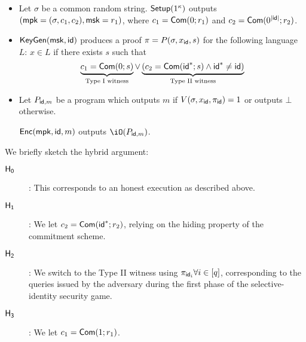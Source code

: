 \begin{itemize}
\item
	Let $\sigma$ be a common random string.
	$\mathsf{Setup}(1^\kappa)$ outputs $(\mathsf{mpk} = (\sigma, c_1, c_2), \mathsf{msk} =
	r_1)$, where $c_1 = \mathsf{Com}(0 ; r_1)$ and
	$c_2 = \mathsf{Com}(0^{|\mathsf{id}|} ; r_2)$.

\item
	$\mathsf{KeyGen}(\mathsf{msk}, \mathsf{id})$ produces a proof
	$\pi = P(\sigma, x_{\mathsf{id}}, s)$ for the following language $L$:
	$x \in L$ if there exists $s$ such that
\begin{equation*}
\underbrace{c_1 = \mathsf{Com}(0 ; s)}_{\text{Type I witness}} \lor
\underbrace{\left( c_2 = \mathsf{Com}(\mathsf{id}^* ; s) \land \mathsf{id}^* \ne \mathsf{id}
	\right)}_{\text{Type II witness}}
\end{equation*}

\item
	Let $P_{\mathsf{id},m}$ be a program which outputs $m$ if
	$V(\sigma, x_{\mathsf{id}}, \pi_{\mathsf{id}}) = 1$ or outputs $\bot$ otherwise.

	$\mathsf{Enc}(\mathsf{mpk}, \mathsf{id}, m)$ outputs $\iO(P_{\id,m})$.
\end{itemize}

We briefly sketch the hybrid argument:
\begin{description}
\item[$\mathsf{H_{0}}$]:
	This corresponds to an honest execution as described above.
\item[$\mathsf{H_{1}}$]:
	We let $c_2 = \mathsf{Com}(\mathsf{id}^* ; r_2)$, relying on the hiding property
	of the commitment scheme.
\item[$\mathsf{H_{2}}$]:
	We switch to the Type II witness using
	$\pi_{\mathsf{id}_i} \forall i \in [q]$, corresponding to the queries
	issued by the adversary during the first phase of the
	selective-identity security game.
\item[$\mathsf{H_{3}}$]:
	We let $c_1 = \mathsf{Com}(1 ; r_1)$.
\end{description}





\newcommand{\extline}{$\scriptsize$-$\normalsize$\!}
\newcommand{\lextlineend}{$\scriptsize$\lhd\!$\normalsize$}
\newcommand{\rextlineend}{$\scriptsize\rule{.1ex}{0ex}$\rhd$\normalsize$}


\newcommand\extlines[1]{%
  \setcounter{index}{0}%
  \whiledo {\value{index}< #1}
  {\addtocounter{index}{1}\extline}
}

